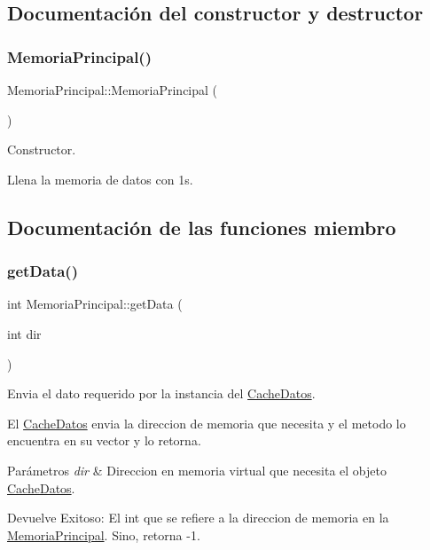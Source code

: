 

\subsection{Documentación del constructor y destructor}
\mbox{\label{classMemoriaPrincipal_a1ffb9d5ffec05ed9bd0fc5c3ca51d200}} 
\subsubsection{\texorpdfstring{Memoria\+Principal()}{MemoriaPrincipal()}}
{\footnotesize\ttfamily Memoria\+Principal\+::\+Memoria\+Principal (\begin{DoxyParamCaption}{ }\end{DoxyParamCaption})}



Constructor. 

Llena la memoria de datos con 1s. 

\subsection{Documentación de las funciones miembro}
\mbox{\label{classMemoriaPrincipal_aaf5f5abab3ddb40a88c9c695c02d29d3}} 
\subsubsection{\texorpdfstring{get\+Data()}{getData()}}
{\footnotesize\ttfamily int Memoria\+Principal\+::get\+Data (\begin{DoxyParamCaption}\item[{int}]{dir }\end{DoxyParamCaption})}



Envia el dato requerido por la instancia del \hyperlink{classCacheDatos}{Cache\+Datos}. 

El \hyperlink{classCacheDatos}{Cache\+Datos} envia la direccion de memoria que necesita y el metodo lo encuentra en su vector y lo retorna. 
\begin{DoxyParams}{Parámetros}
{\em dir} & Direccion en memoria virtual que necesita el objeto \hyperlink{classCacheDatos}{Cache\+Datos}. \\
\hline
\end{DoxyParams}
\begin{DoxyReturn}{Devuelve}
Exitoso\+: El int que se refiere a la direccion de memoria en la \hyperlink{classMemoriaPrincipal}{Memoria\+Principal}. Sino, retorna -\/1. 
\end{DoxyReturn}
\mbox{\label{classMemoriaPrincipal_a0ffe52092ed587006788f4c3d8965f47}} 
